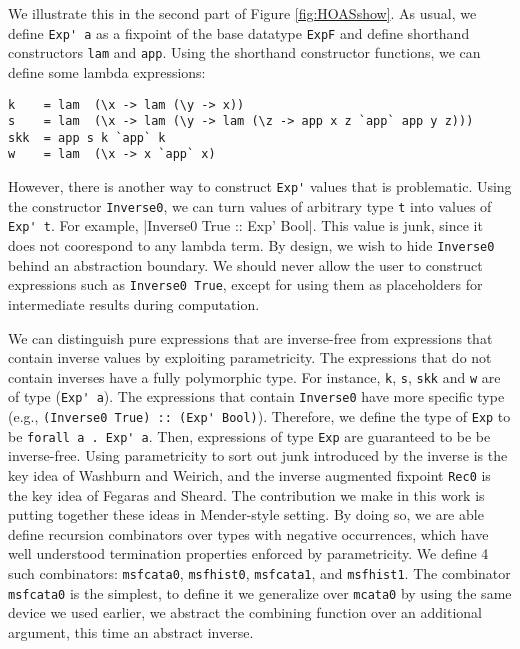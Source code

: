\documentclass[letterpaper,12pt]{article}
\begin{document}
We illustrate this in the second part of Figure \ref{fig:HOASshow}.
As usual, we define \verb|Exp' a| as a fixpoint of the base datatype \verb|ExpF|
and define shorthand constructors \verb|lam| and \verb|app|.
Using the shorthand constructor functions,
we can define some lambda expressions: %
\begin{verbatim}
k    = lam  (\x -> lam (\y -> x))
s    = lam  (\x -> lam (\y -> lam (\z -> app x z `app` app y z)))
skk  = app s k `app` k
w    = lam  (\x -> x `app` x)
\end{verbatim}
However, there is another way to construct \verb|Exp'| values that is
problematic. Using the constructor \verb|Inverse0|, we can turn values of
arbitrary type \verb|t| into values of \verb|Exp' t|.  For example, 
|Inverse0 True :: Exp' Bool|. This value is junk, since it does 
not coorespond to any lambda term. By design, we wish to hide \verb|Inverse0|
behind an abstraction boundary. We should never allow the user to construct
expressions such as \verb|Inverse0 True|, except for using them as placeholders
for intermediate results during computation.


We can distinguish pure expressions that are inverse-free
from expressions that contain inverse values by exploiting parametricity.
The expressions that do not contain inverses have a fully polymorphic type.
For instance, \verb|k|, \verb|s|, \verb|skk| and \verb|w| are of type (\verb|Exp' a|).
The expressions that contain \verb|Inverse0| have more specific type
(e.g., \verb|(Inverse0 True) :: (Exp' Bool)|).
Therefore, we define the type of \verb|Exp| to be \verb|forall a . Exp' a|.
Then, expressions of type \verb|Exp| are guaranteed to be be inverse-free.
Using parametricity to sort out junk introduced by the inverse is the key idea
of Washburn and Weirich\cite{bgb}, and the inverse augmented fixpoint
\verb|Rec0| is the key idea of Fegaras and Sheard\cite{FegShe96}.
The contribution we make in this work is putting together these ideas
in Mender-style setting.  By doing so, we are able define recursion combinators
over types with negative occurrences, which have well understood
termination properties enforced by parametricity. We define 4 such combinators:
\verb|msfcata0|, \verb|msfhist0|, \verb|msfcata1|, and \verb|msfhist1|. 
The combinator \verb|msfcata0| is the simplest, to define it
we generalize over \verb|mcata0| by using the same device we used earlier,
we abstract the combining function over an additional argument,
this time an abstract inverse.
\end{document}
